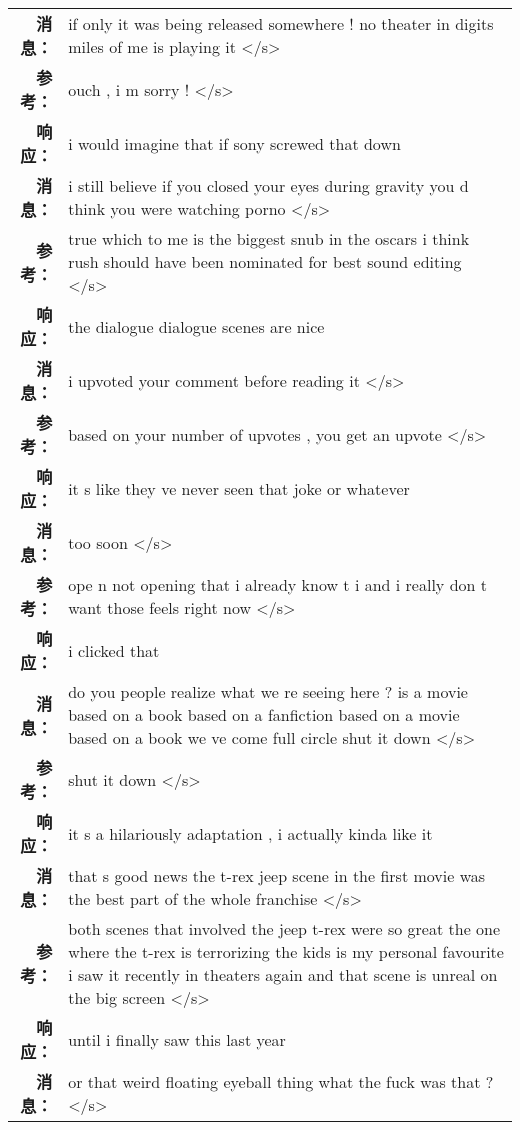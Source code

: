 \begin{tabularx}{\textwidth}{@{}rX@{}}%
\toprule%
\midrule%
\textbf{消息：}&if only it was being released somewhere ! no theater in digits miles of me is playing it </s>\\%
\textbf{参考：}&ouch , i m sorry ! </s>\\%
\textbf{响应：}&i would imagine that if sony screwed that down\\%
\midrule%
\textbf{消息：}&i still believe if you closed your eyes during gravity you d think you were watching porno </s>\\%
\textbf{参考：}&true which to me is the biggest snub in the oscars i think rush should have been nominated for best sound editing </s>\\%
\textbf{响应：}&the dialogue dialogue scenes are nice\\%
\midrule%
\textbf{消息：}&i upvoted your comment before reading it </s>\\%
\textbf{参考：}&based on your number of upvotes , you get an upvote </s>\\%
\textbf{响应：}&it s like they ve never seen that joke or whatever\\%
\midrule%
\textbf{消息：}&too soon </s>\\%
\textbf{参考：}&ope n not opening that i already know t i and i really don t want those feels right now </s>\\%
\textbf{响应：}&i clicked that\\%
\midrule%
\textbf{消息：}&do you people realize what we re seeing here ? is a movie based on a book based on a fanfiction based on a movie based on a book we ve come full circle shut it down </s>\\%
\textbf{参考：}&shut it down </s>\\%
\textbf{响应：}&it s a hilariously adaptation , i actually kinda like it\\%
\midrule%
\textbf{消息：}&that s good news the t{-}rex jeep scene in the first movie was the best part of the whole franchise </s>\\%
\textbf{参考：}&both scenes that involved the jeep t{-}rex were so great the one where the t{-}rex is terrorizing the kids is my personal favourite i saw it recently in theaters again and that scene is unreal on the big screen </s>\\%
\textbf{响应：}&until i finally saw this last year\\%
\midrule%
\textbf{消息：}&or that weird floating eyeball thing what the fuck was that ? </s>\\%

\end{tabularx}
